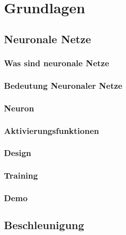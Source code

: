 
\section{Grundlagen}


\subsection{Neuronale Netze}

\subsubsection{Was sind neuronale Netze}

\subsubsection{Bedeutung Neuronaler Netze}

\subsubsection{Neuron}

\subsubsection{Aktivierungsfunktionen}

\subsubsection{Design}

\subsubsection{Training}

\subsubsection{Demo}

\newpage

\subsection{Beschleunigung}

